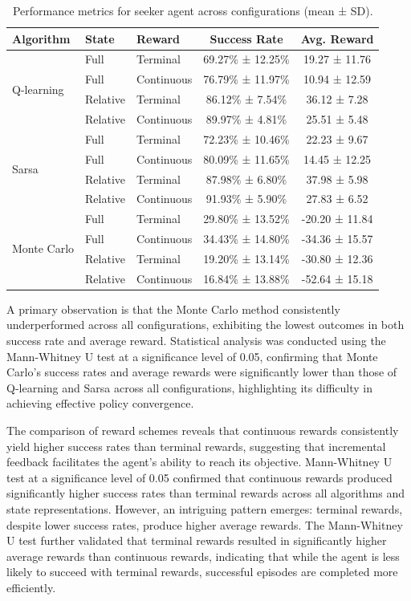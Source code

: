\documentclass[runningheads]{llncs}
\begin{document}
\begin{table}
\caption{Performance metrics for seeker agent across configurations (mean ± SD).}
\label{tab:results}
\begin{normalsize}
\begin{tabular}{|l|l|l|c|c|}
\hline
\textbf{Algorithm} & \textbf{State} & \textbf{Reward} & \textbf{Success Rate} & \textbf{Avg. Reward} \\
\hline
\multirow{4}{*}{Q-learning} 
 & Full & Terminal & 69.27\% ± 12.25\% & 19.27 ± 11.76 \\
 & Full & Continuous & 76.79\% ± 11.97\% & 10.94 ± 12.59 \\
 & Relative & Terminal & 86.12\% ± 7.54\% & 36.12 ± 7.28 \\
 & Relative & Continuous & 89.97\% ± 4.81\% & 25.51 ± 5.48 \\
\hline
\multirow{4}{*}{Sarsa} 
 & Full & Terminal & 72.23\% ± 10.46\% & 22.23 ± 9.67 \\
 & Full & Continuous & 80.09\% ± 11.65\% & 14.45 ± 12.25 \\
 & Relative & Terminal & 87.98\% ± 6.80\% & 37.98 ± 5.98 \\
 & Relative & Continuous & 91.93\% ± 5.90\% & 27.83 ± 6.52 \\
\hline
\multirow{4}{*}{Monte Carlo} 
 & Full & Terminal & 29.80\% ± 13.52\% & -20.20 ± 11.84 \\
 & Full & Continuous & 34.43\% ± 14.80\% & -34.36 ± 15.57 \\
 & Relative & Terminal & 19.20\% ± 13.14\% & -30.80 ± 12.36 \\
 & Relative & Continuous & 16.84\% ± 13.88\% & -52.64 ± 15.18 \\
\hline
\end{tabular}
\end{normalsize}
\end{table}



A primary observation is that the Monte Carlo method consistently underperformed across all configurations, exhibiting the lowest outcomes in both success rate and average reward. Statistical analysis was conducted using the Mann-Whitney U test at a significance level of 0.05, confirming that Monte Carlo’s success rates and average rewards were significantly lower than those of Q-learning and Sarsa across all configurations, highlighting its difficulty in achieving effective policy convergence.

The comparison of reward schemes reveals that continuous rewards consistently yield higher success rates than terminal rewards, suggesting that incremental feedback facilitates the agent’s ability to reach its objective. Mann-Whitney U test at a significance level of 0.05 confirmed that continuous rewards produced significantly higher success rates than terminal rewards across all algorithms and state representations. However, an intriguing pattern emerges: terminal rewards, despite lower success rates, produce higher average rewards. The Mann-Whitney U test further validated that terminal rewards resulted in significantly higher average rewards than continuous rewards, indicating that while the agent is less likely to succeed with terminal rewards, successful episodes are completed more efficiently.
\end{document}
